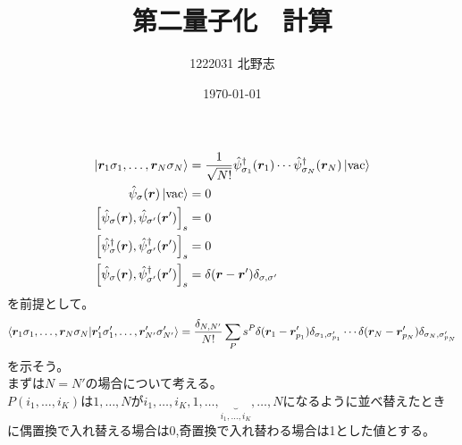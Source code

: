 \documentclass{ltjsarticle}
\title{第二量子化　計算}
\author{1222031 北野志}
\date{\today}
\begin{document}
\maketitle


  \begin{align}
    \ket{\bm{r}_1\sigma_1,\dots,\bm{r}_N\sigma_N}&=\frac{1}{\sqrt{N!}}\hat{\psi}_{\sigma_1}^\dag (\bm{r}_1)\cdots\hat{\psi}_{\sigma_N}^\dag (\bm{r}_N)\ket{\rm{vac}} \\
    \hat{\psi}_\sigma (\bm{r})\ket{\rm{vac}}&=0\\
    \comm{\hat{\psi}_\sigma(\bm{r})}{\hat{\psi}_{\sigma'}(\bm{r}')}_s&=0\\
    \comm{\hat{\psi}^\dag_\sigma(\bm{r})}{\hat{\psi}^\dag_{\sigma'}(\bm{r}')}_s&=0\\
    \comm{\hat{\psi}_\sigma(\bm{r})}{\hat{\psi}^\dag_{\sigma'}(\bm{r}')}_s&=\delta(\bm{r}-\bm{r}')\delta_{\sigma,\sigma'}
  \end{align}
を前提として。
\begin{align}
  \braket{\bm{r}_1\sigma_1,\dots,\bm{r}_N\sigma_N}{\bm{r}'_1\sigma'_1,\dots,\bm{r}'_{N'}\sigma'_{N'}}=\frac{\delta_{N,N'}}{N!}\sum_P s^P\delta(\bm{r}_1-\bm{r}'_{p_1})\delta_{\sigma_1,\sigma'_{p_1}}\cdots\delta(\bm{r}_N-\bm{r}'_{p_N})\delta_{\sigma_N,\sigma'_{p_N}}
\end{align}
を示そう。\\
まずは$N=N'$の場合について考える。\\
$P(i_1,\dots,i_K)$は$1,\dots,N$が$i_1,\dots,i_K,1,\dots,\underbrace{}_{i_1,\dots,i_K},\dots,N$になるように並べ替えたときに偶置換で入れ替える場合は0,奇置換で入れ替わる場合は1とした値とする。
\end{document}
